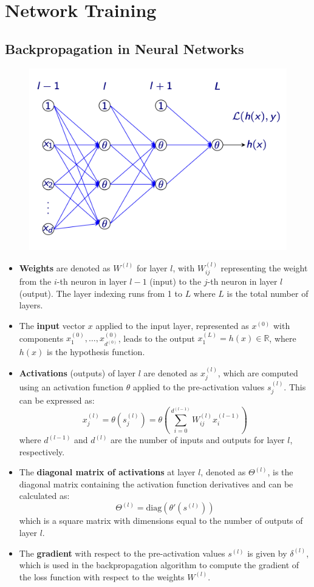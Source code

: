 \chapter{Network Training}
\section{Backpropagation in Neural Networks}


\begin{figure}[H]
    \centering
    \includegraphics[width=0.55\linewidth]{img/nn.png}
\end{figure}

\begin{itemize}
    \item \textbf{Weights} are denoted as \( W^{(l)} \) for layer \( l \), with \( W_{ij}^{(l)} \) representing the weight from the \( i \)-th neuron in layer \( l-1 \) (input) to the \( j \)-th neuron in layer \( l \) (output). The layer indexing runs from 1 to \( L \) where \( L \) is the total number of layers.
    \item The \textbf{input} vector \( x \) applied to the input layer, represented as \( x^{(0)} \) with components \( x_1^{(0)}, \ldots, x_{d^{(0)}}^{(0)} \), leads to the output \( x_1^{(L)} = h(x) \in \mathbb{R} \), where \( h(x) \) is the hypothesis function.
    \item \textbf{Activations} (outputs) of layer \( l \) are denoted as \( x_j^{(l)} \), which are computed using an activation function \( \theta \) applied to the pre-activation values \( s_j^{(l)} \). This can be expressed as:
    \[ x_j^{(l)} = \theta(s_j^{(l)}) = \theta \left( \sum_{i=0}^{d^{(l-1)}} W_{ij}^{(l)} x_i^{(l-1)} \right) \]
    where \( d^{(l-1)} \) and \( d^{(l)} \) are the number of inputs and outputs for layer \( l \), respectively.
    \item The \textbf{diagonal matrix of activations} at layer \( l \), denoted as \( \Theta^{(l)} \), is the diagonal matrix containing the activation function derivatives and can be calculated as:
    \[ \Theta^{(l)} = \text{diag}(\theta'(s^{(l)})) \]
    which is a square matrix with dimensions equal to the number of outputs of layer \( l \).
    \item The \textbf{gradient} with respect to the pre-activation values \( s^{(l)} \) is given by \( \delta^{(l)} \), which is used in the backpropagation algorithm to compute the gradient of the loss function with respect to the weights \( W^{(l)} \).
\end{itemize}


